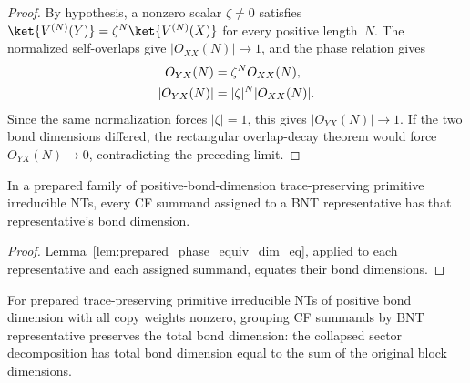 \begin{proof}\leanok
    By hypothesis, a nonzero scalar $\zeta\neq0$ satisfies
    $\ket{V^{(N)}(Y)}=\zeta^N\ket{V^{(N)}(X)}$ for every positive length~$N$.
    The normalized self-overlaps give $|O_{XX}(N)|\to 1$, and the phase relation
    gives
    \begin{align}
        O_{YX}(N)   & =\zeta^N O_{XX}(N),
        \notag                                \\
        |O_{YX}(N)| & =|\zeta|^N |O_{XX}(N)|.
        \notag
    \end{align}
    Since the same normalization forces $|\zeta|=1$, this gives
    $|O_{YX}(N)|\to 1$.
    If the two bond dimensions differed, the rectangular overlap-decay theorem
    would force $O_{YX}(N)\to 0$, contradicting the preceding limit.
\end{proof}

\begin{lemma}%
    \label{lem:prepared_phase_class_dim_eq}
    \leanok
    In a prepared family of positive-bond-dimension trace-preserving primitive
    irreducible NTs, every CF summand assigned to a BNT representative has that
    representative's bond dimension.
\end{lemma}

\begin{proof}\leanok
    Lemma~\ref{lem:prepared_phase_equiv_dim_eq}, applied to each representative
    and each assigned summand, equates their bond dimensions.
\end{proof}

\begin{lemma}%
    \label{lem:prepared_collapsed_bnt_sector_decomp_total_dim}
    \leanok
    For prepared trace-preserving primitive irreducible NTs of positive bond
    dimension with all copy weights nonzero, grouping CF summands by BNT
    representative preserves the total bond dimension: the collapsed sector
    decomposition has total bond dimension equal to the sum of the original block
    dimensions.
\end{lemma}


